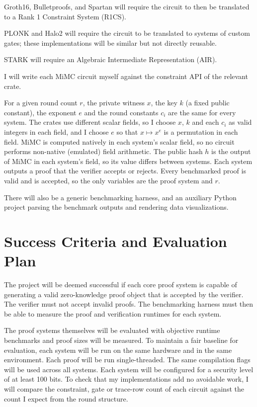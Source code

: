 \documentclass[11pt,a4paper]{article}
\begin{document}
Groth16, Bulletproofs, and Spartan will require the circuit to then be translated to a Rank 1 Constraint System (R1CS).

PLONK and Halo2 will require the circuit to be translated to systems of custom gates; these implementations will be similar but not directly reusable.

STARK will require an Algebraic Intermediate Representation (AIR).

I will write each MiMC circuit myself against the constraint API of the relevant crate.

For a given round count $r$, the private witness $x$, the key $k$ (a fixed public constant), the exponent $e$ and the round constants $c_i$ are the same for every system. The crates use different scalar fields, so I choose $x$, $k$ and each $c_i$ as valid integers in each field, and I choose $e$ so that $x \mapsto x^e$ is a permutation in each field. MiMC is computed natively in each system's scalar field, so no circuit performs non-native (emulated) field arithmetic. The public hash $h$ is the output of MiMC in each system's field, so its value differs between systems. Each system outputs a proof that the verifier accepts or rejects. Every benchmarked proof is valid and is accepted, so the only variables are the proof system and $r$.

There will also be a generic benchmarking harness, and an auxiliary Python project parsing the benchmark outputs and rendering data visualizations.

\section{Success Criteria and Evaluation Plan}

The project will be deemed successful if each core proof system is capable of generating a valid zero-knowledge proof object that is accepted by the verifier. The verifier must not accept invalid proofs. The benchmarking harness must then be able to measure the proof and verification runtimes for each system.

The proof systems themselves will be evaluated with objective runtime benchmarks and proof sizes will be measured. To maintain a fair baseline for evaluation, each system will be run on the same hardware and in the same environment. Each proof will be run single-threaded. The same compilation flags will be used across all systems. Each system will be configured for a security level of at least 100 bits. To check that my implementations add no avoidable work, I will compare the constraint, gate or trace-row count of each circuit against the count I expect from the round structure.
\end{document}
